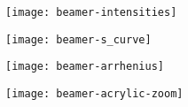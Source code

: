 \documentclass[english, fleqn]{beamer}
\begin{document}
\begin{frame}
    \texttt{[image: beamer-intensities]}
\end{frame}


\begin{frame}
    \texttt{[image: beamer-s\_curve]}
\end{frame}


\begin{frame}
    \texttt{[image: beamer-arrhenius]}
\end{frame}


\begin{frame}
    \texttt{[image: beamer-acrylic-zoom]}
\end{frame}


\end{document}
